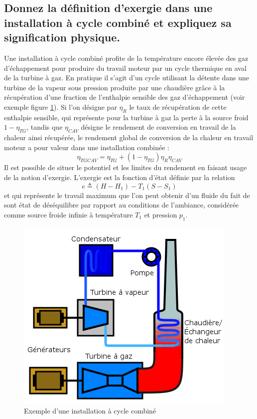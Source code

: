 \subsection{Donnez la définition d'exergie dans une installation à cycle combiné et expliquez sa signification physique.}
Une installation à cycle combiné profite de la température encore élevée des gaz d'échappement pour produire du travail moteur par un cycle thermique en aval de la turbine à gaz. En pratique il s'agit d'un cycle utilisant la détente dans une turbine de la vapeur sous pression produite par une chaudière grâce à la récupération d'une fraction de l'enthalpie sensible des gaz d'échappement (voir exemple figure \ref{fig:cycleTGCAV}). Si l'on désigne par $\eta_R$ le taux de récupération de cette enthalpie sensible, qui représente pour la turbine à gaz la perte à la source froid $1-\eta_{TG}$, tandis que $\eta_{CAV}$ désigne le rendement de conversion en travail de la chaleur ainsi récupérée, le rendement global de conversion de la chaleur en travail moteur a pour valeur dans une installation combinée :
\begin{equation} \eta_{TGCAV} = \eta_{TG} + (1-\eta_{TG})\eta_R\eta_{CAV} \label{eq:eta_TGCAV}\end{equation}
Il est possible de situer le potentiel et les limites du rendement en faisant usage de la notion d'exergie. L'exergie est la fonction d'état définie par la relation 
\begin{equation} e \triangleq (H-H_1)-T_1(S-S_1) \end{equation}
et qui représente le travail maximum que l'on peut obtenir d'un fluide du fait de sont état de déséquilibre par rapport au conditions de l'ambiance, considérée comme source froide infinie à température $T_1$ et pression $p_1$.
\begin{figure}[p]\centering
	\includegraphics{figures/cycleTGCAV}	
	\caption{Exemple d'une installation à cycle combiné\label{fig:cycleTGCAV}}
\end{figure}

